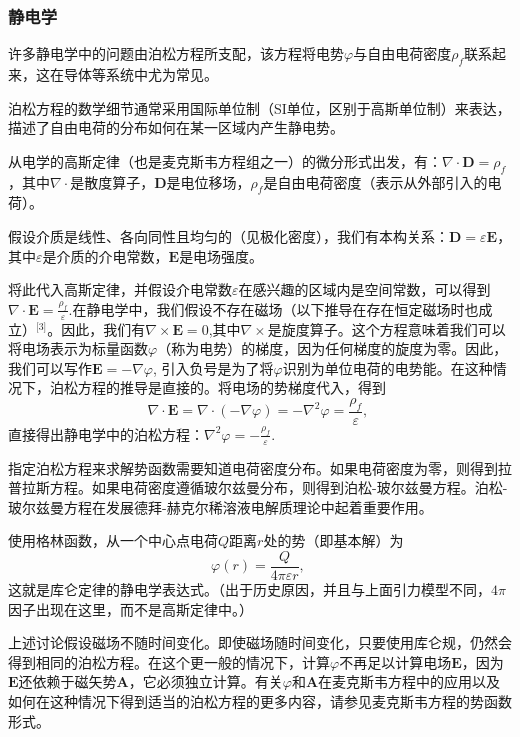 \subsubsection{静电学}
许多静电学中的问题由泊松方程所支配，该方程将电势\(\varphi\)与自由电荷密度\(\rho_f\)联系起来，这在导体等系统中尤为常见。

泊松方程的数学细节通常采用国际单位制（SI单位，区别于高斯单位制）来表达，描述了自由电荷的分布如何在某一区域内产生静电势。

从电学的高斯定律（也是麦克斯韦方程组之一）的微分形式出发，有：\(\nabla \cdot \mathbf{D} = \rho_f\)，其中\(\nabla \cdot\)是散度算子，\(\mathbf{D}\)是电位移场，\(\rho_f\)是自由电荷密度（表示从外部引入的电荷）。

假设介质是线性、各向同性且均匀的（见极化密度），我们有本构关系：\(\mathbf{D} = \varepsilon \mathbf{E}\)，其中\(\varepsilon\)是介质的介电常数，\(\mathbf{E}\)是电场强度。

将此代入高斯定律，并假设介电常数\(\varepsilon\)在感兴趣的区域内是空间常数，可以得到\(\nabla \cdot \mathbf{E} = \frac{\rho_f}{\varepsilon}\).在静电学中，我们假设不存在磁场（以下推导在存在恒定磁场时也成立）\(^\text{[3]}\)。因此，我们有\(\nabla \times \mathbf{E} = 0\),其中\(\nabla \times\)是旋度算子。这个方程意味着我们可以将电场表示为标量函数\(\varphi\)（称为电势）的梯度，因为任何梯度的旋度为零。因此，我们可以写作\(\mathbf{E} = -\nabla \varphi\), 
引入负号是为了将\(\varphi\)识别为单位电荷的电势能。在这种情况下，泊松方程的推导是直接的。将电场的势梯度代入，得到
\[
\nabla \cdot \mathbf{E} = \nabla \cdot (-\nabla \varphi) = -\nabla^2 \varphi = \frac{\rho_f}{\varepsilon},~
\]
直接得出静电学中的泊松方程：\(\nabla^2 \varphi = -\frac{\rho_f}{\varepsilon}\).

指定泊松方程来求解势函数需要知道电荷密度分布。如果电荷密度为零，则得到拉普拉斯方程。如果电荷密度遵循玻尔兹曼分布，则得到泊松-玻尔兹曼方程。泊松-玻尔兹曼方程在发展德拜-赫克尔稀溶液电解质理论中起着重要作用。

使用格林函数，从一个中心点电荷\(Q\)距离\(r\)处的势（即基本解）为  
\[
\varphi(r) = \frac{Q}{4\pi \varepsilon r},~
\]  
这就是库仑定律的静电学表达式。（出于历史原因，并且与上面引力模型不同，\(4\pi\)因子出现在这里，而不是高斯定律中。）

上述讨论假设磁场不随时间变化。即使磁场随时间变化，只要使用库仑规，仍然会得到相同的泊松方程。在这个更一般的情况下，计算\(\varphi\)不再足以计算电场\(\mathbf{E}\)，因为\(\mathbf{E}\)还依赖于磁矢势\(\mathbf{A}\)，它必须独立计算。有关\(\varphi\)和\(\mathbf{A}\)在麦克斯韦方程中的应用以及如何在这种情况下得到适当的泊松方程的更多内容，请参见麦克斯韦方程的势函数形式。

